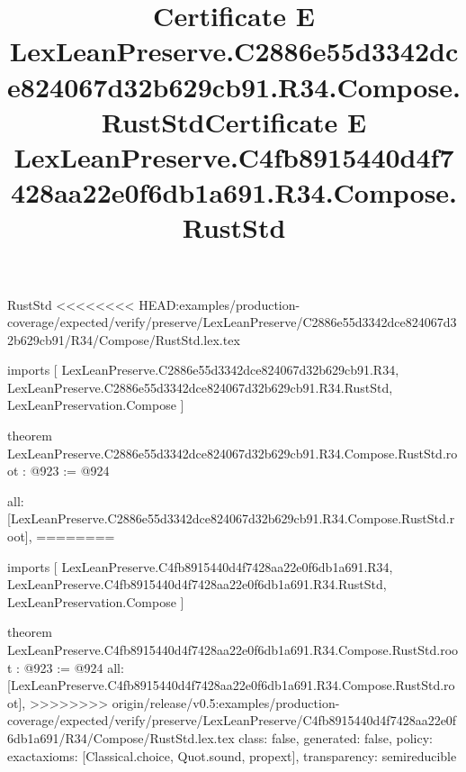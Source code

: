 \begin{lexlean}{RustStd}
<<<<<<<< HEAD:examples/production-coverage/expected/verify/preserve/LexLeanPreserve/C2886e55d3342dce824067d32b629cb91/R34/Compose/RustStd.lex.tex
\title{Certificate E LexLeanPreserve.C2886e55d3342dce824067d32b629cb91.R34.Compose.RustStd}
\begin{coremodule}
imports [
  LexLeanPreserve.C2886e55d3342dce824067d32b629cb91.R34,
  LexLeanPreserve.C2886e55d3342dce824067d32b629cb91.R34.RustStd,
  LexLeanPreservation.Compose
]

theorem LexLeanPreserve.C2886e55d3342dce824067d32b629cb91.R34.Compose.RustStd.root : @923 := @924 {
  all: [LexLeanPreserve.C2886e55d3342dce824067d32b629cb91.R34.Compose.RustStd.root],
========
\title{Certificate E LexLeanPreserve.C4fb8915440d4f7428aa22e0f6db1a691.R34.Compose.RustStd}
\begin{coremodule}
imports [
  LexLeanPreserve.C4fb8915440d4f7428aa22e0f6db1a691.R34,
  LexLeanPreserve.C4fb8915440d4f7428aa22e0f6db1a691.R34.RustStd,
  LexLeanPreservation.Compose
]

theorem LexLeanPreserve.C4fb8915440d4f7428aa22e0f6db1a691.R34.Compose.RustStd.root : @923 := @924 {
  all: [LexLeanPreserve.C4fb8915440d4f7428aa22e0f6db1a691.R34.Compose.RustStd.root],
>>>>>>>> origin/release/v0.5:examples/production-coverage/expected/verify/preserve/LexLeanPreserve/C4fb8915440d4f7428aa22e0f6db1a691/R34/Compose/RustStd.lex.tex
  class: false,
  generated: false,
  policy: exact{axioms: [Classical.choice, Quot.sound, propext]},
  transparency: semireducible
}


\end{coremodule}}
\end{coremodule}
\end{lexlean}
